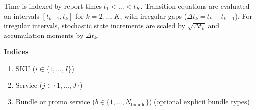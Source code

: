 \documentclass[11pt]{article}
\begin{document}
\begin{center}
{%
}%
\end{center}

Time is indexed by report times $t_1 < \dots < t_K$.
Transition equations are evaluated on intervals $[t_{k-1},t_k]$ for $k=2,\dots,K$, with irregular gaps ($\Delta t_k = t_k - t_{k-1}$).
For irregular intervals, stochastic state increments are scaled by $\sqrt{\Delta t_k}$ and accumulation moments by $\Delta t_k$.

\textbf{Indices}
\begin{enumerate}
  \item SKU ($i \in \{1,\dots,I\}$)
  \item Service ($j \in \{1,\dots,J\}$)
  \item Bundle or promo service ($b \in \{1,\dots,N_{\mathrm{bundle}}\}$) (optional explicit bundle types)
\end{enumerate}
\end{document}
